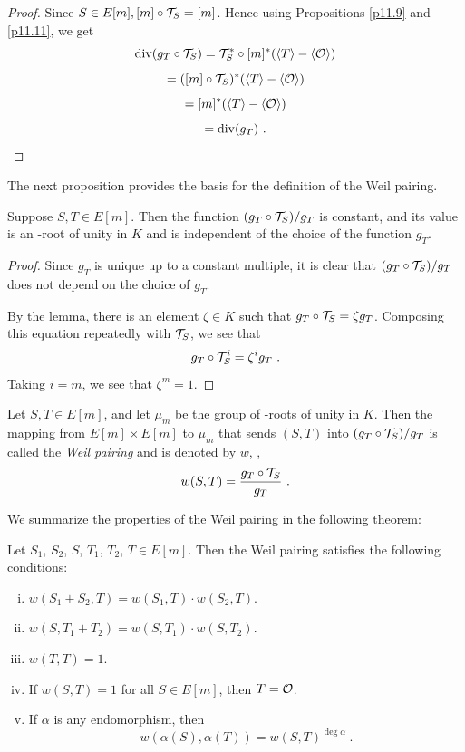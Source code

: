 \begin{proof} Since $S\in E[m],[m]\circ \mathcal{T}_{S}=[m]$. Hence using Propositions \ref{p11.9} and \ref{p11.11}, we get
$$
\operatorname{div}(g_{T}\circ \mathcal{T}_{S})=\mathcal{T}_{S}^{*}\circ[m]^{*}(\left\langle T \right \rangle-\left\langle \mathcal{O} \right \rangle)
$$
$$
=([m]\circ \mathcal{T}_{S})^{*}(\left\langle T \right \rangle-\left\langle \mathcal{O} \right \rangle)
$$
$$
=[m]^{*}(\left\langle T \right \rangle-\left\langle \mathcal{O} \right \rangle)
$$
$$
=\operatorname{div}(g_{T})\ .
$$
\end{proof}
The next proposition provides the basis for the definition of the Weil pairing.

\begin{prop}
\label{p13.4}
Suppose $S,T\in E[m]$. Then the function $(g_{T}\circ \mathcal{T}_{S})/g_{T}$ is constant, and its value is an -root of unity in $K$ and is independent of the choice of the function $g_{T}$.
\end{prop}

\begin{proof}
Since $g_{T}$ is unique up to a constant multiple, it is clear that $(g_{T}\circ \mathcal{T}_{S})/g_{T}$ does not depend on the choice of $g_{T}$.

By the lemma, there is an element $\zeta\in K$ such that $g_{T}\circ \mathcal{T}_{S}=\zeta g_{T}$. Composing this equation repeatedly with $\mathcal{T}_{S}$, we see that
$$
g_{T}\circ \transl{S}^{i}=\zeta^{i}g_{T}\ .
$$
Taking $i=m$, we see that $\zeta^{m}=1$.
\end{proof}

\begin{defi}
\label{d13.5}
Let $S,T\in E[m]$, and let $\mu_{m}$ be the group of -roots of unity in $K$. Then the mapping from $E[m]\times E[m]$ to $\mu_{m}$ that sends $(S, T)$ into $(g_{T}\circ \mathcal{T}_{S})/g_{T}$ is called the {\it Weil pairing} and is denoted by $w$, \ie,
$$
w(S,T)=\frac{g_{T}\circ \mathcal{T}_{S}}{g_{T}}\ .
$$
\end{defi}

We summarize the properties of the Weil pairing in the following theorem:

\begin{theo}
\label{t13.6}
Let $S_{1}$, $S_{2}$, $S$, $T_{1}$, $T_{2}$, $T\in E[m]$. Then the Weil pairing satisfies the following conditions:

\begin{enumerate}[(i)]
\item
$w(S_{1}+S_{2},T)=w(S_{1},T)\cdot w(S_{2},T)$.
\item
$w(S,T_{1}+T_{2})=w(S,T_{1})\cdot w(S,T_{2})$.
\item
$w(T,T)=1$.
\item
If $w(S,T)=1$ for all $S\in E[m]$, then $T=\mathcal{O}$.
\item
If $\alpha$ is any endomorphism, then
$$
w(\alpha(S),\alpha(T))=w(S,T)^{\deg\alpha}\ .
$$
\end{enumerate}
\end{theo}


